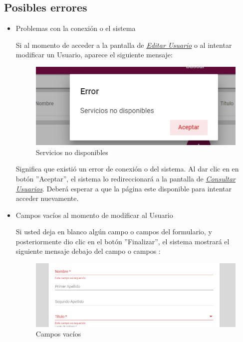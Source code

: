                 \subsection{Posibles errores}
                    \begin{itemize}
                        \item Problemas con la conexión o el sistema
                    
                            Si al momento de acceder a la pantalla de \hyperlink{editarUs}{\textit{Editar Usuario}} o al intentar modificar un Usuario, aparece el siguiente mensaje:
                            \clearpage
                            \begin{figure}[!hbtp]
                            	\centering
                            	\includegraphics[width=0.4\linewidth]{images/SP5/MSGSN}
                            	\caption{Servicios no disponibles}
                            	
                            \end{figure}
                           
                        
                            Significa que existió un error de conexión o del sistema. Al dar clic en en botón ''Aceptar'', el sistema lo redireccionará  a la pantalla de \hyperlink{consultarUs}{\textit{Consultar Usuarios}}. Deberá esperar a que la página este disponible para intentar acceder nuevamente.
                    
                        \item Campos vacíos al momento de modificar al Usuario
                    
                            Si usted deja en blanco algún campo o campos del formulario, y posteriormente dio clic en el botón ''Finalizar'', el sistema mostrará el siguiente mensaje debajo del campo o campos :
                           
                          \begin{figure}[!hbtp]
                         	\centering
                         	\includegraphics[width=0.4\linewidth]{images/SP5/MSG44}
                         	\caption{Campos vacíos}
                         	\label{mensaje44}
                         

\end{figure}
\end{itemize}
